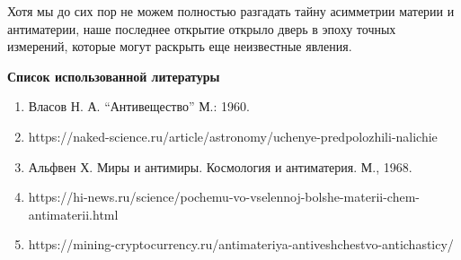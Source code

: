 \begin{flushleft}
Хотя мы до сих пор не можем полностью разгадать тайну асимметрии материи и антиматерии, 
наше последнее открытие открыло дверь в эпоху точных измерений, которые могут раскрыть еще 
неизвестные явления.

\newpage
\textbf{Список использованной литературы}
\vspace*{14pt}

\begin{enumerate}
    \item Власов Н. А. “Антивещество” М.: 1960.
    \item https://naked-science.ru/article/astronomy/uchenye-predpolozhili-nalichie
    \item Альфвен Х. Миры и антимиры. Космология и антиматерия. М., 1968.
    \item https://hi-news.ru/science/pochemu-vo-vselennoj-bolshe-materii-chem-antimaterii.html
    \item https://mining-cryptocurrency.ru/antimateriya-antiveshchestvo-antichasticy/
\end{enumerate}
\end{flushleft}
